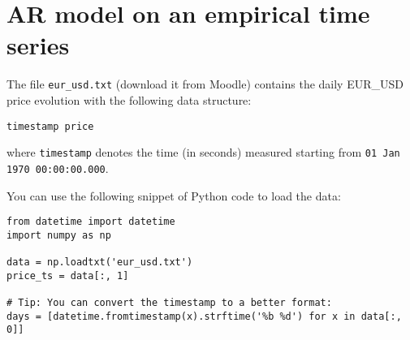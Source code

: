 \section{AR model on an empirical time series}

The file \texttt{eur\_usd.txt} (download it from Moodle) contains the daily EUR\_USD price evolution with the following data structure:
\begin{verbatim}
timestamp price
\end{verbatim}

\noindent where \texttt{timestamp} denotes the time (in seconds) measured starting from \texttt{01 Jan 1970 00:00:00.000}.

\noindent You can use the following snippet of Python code to load the data: 

\begin{verbatim}
from datetime import datetime
import numpy as np

data = np.loadtxt('eur_usd.txt')
price_ts = data[:, 1]

# Tip: You can convert the timestamp to a better format:
days = [datetime.fromtimestamp(x).strftime('%b %d') for x in data[:, 0]]
\end{verbatim}



